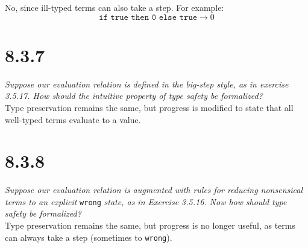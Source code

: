 \documentclass{article}
\renewcommand{\ss}[2]{#1 \longrightarrow #2}
\newcommand{\ms}[1]{\texttt{#1}}
\theoremstyle{remark}
\begin{document}
    No, since ill-typed terms can also take a step. For example:
    $$\ss{\ms{if true then 0 else true}}{0}$$

\section{8.3.7}

    \textit{Suppose our evaluation relation is defined in the big-step style, as in exercise}
    \textit{3.5.17. How should the intuitive property of type safety be formalized?} \\

    Type preservation remains the same, but progress is modified to state that all well-typed terms
    evaluate to a value.

\section{8.3.8}

    \textit{Suppose our evaluation relation is augmented with rules for reducing nonsensical}
    \textit{terms to an explicit} \ms{wrong} \textit{state, as in Exercise 3.5.16. Now how}
    \textit{should type safety be formalized?} \\

    Type preservation remains the same, but progress is no longer useful, as terms can always
    take a step (sometimes to \ms{wrong}).
\end{document}
